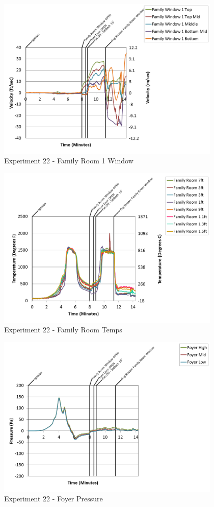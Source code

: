 \documentclass{article}
\begin{document}
\begin{appendices}
\begin{figure}[h!]
	\centering
	\includegraphics[height=3.05in]{0_Images/Results_Charts/Exp_22_Charts/FamilyRoom1Window.png}
	\caption{Experiment 22 - Family Room 1 Window}
\end{figure}

\clearpage

\begin{figure}[h!]
	\centering
	\includegraphics[height=3.05in]{0_Images/Results_Charts/Exp_22_Charts/FamilyRoomTemps.png}
	\caption{Experiment 22 - Family Room Temps}
\end{figure}


\begin{figure}[h!]
	\centering
	\includegraphics[height=3.05in]{0_Images/Results_Charts/Exp_22_Charts/FoyerPressure.png}
	\caption{Experiment 22 - Foyer Pressure}
\end{figure}


\end{appendices}
\end{document}
